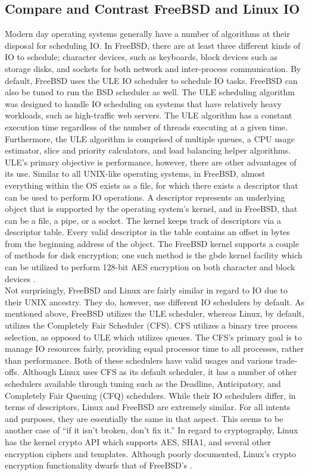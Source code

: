 \documentclass[onecolumn, draftclsnofoot,10pt, compsoc]{IEEEtran}
\begin{document}
\subsection{Compare and Contrast FreeBSD and Linux IO}
\noindent Modern day operating systems generally have a number of algorithms at their disposal for scheduling IO. In FreeBSD, there are at least three different kinds of IO to schedule; character devices, such as keyboards, block devices such as storage disks, and sockets for both network and inter-process communication. By default, FreeBSD uses the ULE IO scheduler to schedule IO tasks. FreeBSD can also be tuned to run the BSD scheduler as well. The ULE scheduling algorithm was designed to handle IO scheduling on systems that have relatively heavy workloads, such as high-traffic web servers. The ULE algorithm has a constant execution time regardless of the number of threads executing at a given time. Furthermore, the ULE algorithm is comprised of multiple queues, a CPU usage estimator, slice and priority calculators, and load balancing helper algorithms. ULE’s primary objective is performance, however, there are other advantages of its use. Similar to all UNIX-like operating systems, in FreeBSD, almost everything within the OS exists as a file, for which there exists a descriptor that can be used to perform IO operations. A descriptor represents an underlying object that is supported by the operating system’s kernel, and in FreeBSD, that can be a file, a pipe, or a socket. The kernel keeps track of descriptors via a descriptor table. Every valid descriptor in the table contains an offset in bytes from the beginning address of the object. The FreeBSD kernel supports a couple of methods for disk encryption; one such method is the gbde kernel facility which can be utilized to perform 128-bit AES encryption on both character and block devices \cite{FreeBSD1IO} \cite{FreeBSD2IO} \cite{FreeBSD3IO}.\\

\noindent Not surprisingly, FreeBSD and Linux are fairly similar in regard to IO due to their UNIX ancestry. They do, however, use different IO schedulers by default. As mentioned above, FreeBSD utilizes the ULE scheduler, whereas Linux, by default, utilizes the Completely Fair Scheduler (CFS). CFS utilizes a binary tree process selection, as opposed to ULE which utilizes queues. The CFS’s primary goal is to manage IO resources fairly, providing equal processor time to all processes, rather than performance. Both of these schedulers have valid usages and various trade-offs. Although Linux uses CFS as its default scheduler, it has a number of other schedulers available through tuning such as the Deadline, Anticipatory, and Completely Fair Queuing (CFQ) schedulers. While their IO schedulers differ, in terms of descriptors, Linux and FreeBSD are extremely similar. For all intents and purposes, they are essentially the same in that aspect. This seems to be another case of “if it isn’t broken, don’t fix it.” In regard to cryptography, Linux has the kernel crypto API which supports AES, SHA1, and several other encryption ciphers and templates. Although poorly documented, Linux’s crypto encryption functionality dwarfs that of FreeBSD’s \cite{Linux1IO} \cite{Linux2IO}.\\
\end{document}

